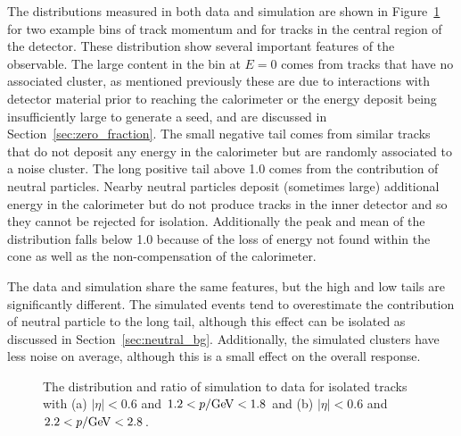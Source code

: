 The \ep distributions measured in both data and simulation are shown in Figure~\ref{fig:eoverp} for two example bins of track momentum and for tracks in the central region of the detector. 
These distribution show several important features of the \ep observable.
The large content in the bin at $E=0$ comes from tracks that have no associated cluster, as mentioned previously these are due to interactions with detector material prior to reaching the calorimeter or the energy deposit being insufficiently large to generate a seed, and are discussed in Section~\ref{sec:zero_fraction}.
The small negative tail comes from similar tracks that do not deposit any energy in the calorimeter but are randomly associated to a noise cluster.
The long positive tail above 1.0 comes from the contribution of neutral particles.
Nearby neutral particles deposit (sometimes large) additional energy in the calorimeter but do not produce tracks in the inner detector and so they cannot be rejected for isolation.
Additionally the peak and mean of the distribution falls below 1.0 because of the loss of energy not found within the cone as well as the non-compensation of the calorimeter.

The data and simulation share the same features, but the high and low tails are significantly different.
The simulated events tend to overestimate the contribution of neutral particle to the long tail, although this effect can be isolated as discussed in Section~\ref{sec:neutral_bg}. 
Additionally, the simulated clusters have less noise on average, although this is a small effect on the overall response.

\begin{figure}[htbp]
\centering
{}
\caption{The \ep distribution and ratio of simulation to data for isolated tracks with (a) $|\eta| < 0.6$ and $1.2 < p /\GeV < 1.8$ and (b) $|\eta| < 0.6$ and $2.2 < p /\GeV < 2.8$.}

\label{fig:eoverp}
\end{figure}

